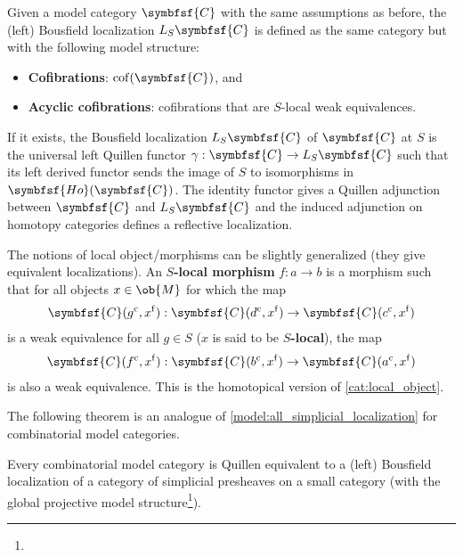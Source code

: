     \begin{construct}
        Given a model category $\symbfsf{C}$ with the same assumptions as before, the (left) Bousfield localization $L_S\symbfsf{C}$ is defined as the same category but with the following model structure:
        \begin{itemize}
            \item\textbf{Cofibrations}: $\mathrm{cof}(\symbfsf{C})$, and
            \item\textbf{Acyclic cofibrations}: cofibrations that are $S$-local weak equivalences.
        \end{itemize}
        If it exists, the Bousfield localization $L_S\symbfsf{C}$ of $\symbfsf{C}$ at $S$ is the universal left Quillen functor $\gamma:\symbfsf{C}\rightarrow L_S\symbfsf{C}$ such that its left derived functor sends the image of $S$ to isomorphisms in $\symbfsf{Ho}(\symbfsf{C})$. The identity functor gives a Quillen adjunction between $\symbfsf{C}$ and $L_S\symbfsf{C}$ and the induced adjunction on homotopy categories defines a reflective localization.
    \end{construct}
    \begin{remark}
        The notions of local object/morphisms can be slightly generalized (they give equivalent localizations). An \textbf{$S$-local morphism} $f:a\rightarrow b$ is a morphism such that for all objects $x\in\ob{M}$ for which the map
        \begin{gather}
            \symbfsf{C}(g^{\mathrm{c}},x^{\mathrm{f}}):\symbfsf{C}(d^{\mathrm{c}},x^{\mathrm{f}})\rightarrow\symbfsf{C}(c^{\mathrm{c}},x^{\mathrm{f}})
        \end{gather}
        is a weak equivalence for all $g\in S$ ($x$ is said to be \textbf{$S$-local}), the map
        \begin{gather}
            \symbfsf{C}(f^{\mathrm{c}},x^{\mathrm{f}}):\symbfsf{C}(b^{\mathrm{c}},x^{\mathrm{f}})\rightarrow\symbfsf{C}(a^{\mathrm{c}},x^{\mathrm{f}})
        \end{gather}
        is also a weak equivalence. This is the homotopical version of \cref{cat:local_object}.
    \end{remark}


    The following theorem is an analogue of \cref{model:all_simplicial_localization} for combinatorial model categories.
    \begin{theorem}[Dugger]\label{model:dugger}
        Every combinatorial model category is Quillen equivalent to a (left) Bousfield localization of a category of simplicial presheaves on a small category (with the global projective model structure\footnote{}).
    \end{theorem}

